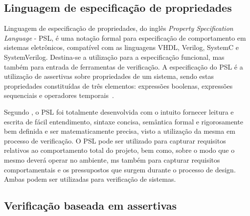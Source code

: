 \subsection{Linguagem de especificação de propriedades}
Linguagem de especificação de propriedades, do inglês \textit{Property Specification Language} - PSL, é uma notação formal para especificação de comportamento em sistemas eletrônicos, compatível com as linguagens VHDL, Verilog, SystemC e SystemVerilog. Destina-se a utilização para a especificação funcional, mas também para entrada de ferramentas de verificação. A especificação do PSL é a utilização de assertivas sobre propriedades de um sistema, sendo estas propriedades constituídas de três elementos: expressões boolenas, expressões sequenciais e operadores temporais~\cite{IEEEPSL}.


\par
Segundo \cite{IEEEPSL}, o PSL foi totalmente desenvolvida com o intuito fornecer leitura e escrita de fácil entendimento, sintaxe concisa, semântica formal e rigorosamente bem definida e ser matematicamente precisa, visto a utilização da mesma em processo de verificação. 
% 
O PSL pode ser utilizado para capturar requisitos relativos ao comportamento total do projeto, bem como, sobre o modo que o mesmo deverá operar no ambiente, ms também para capturar requisitos comportamentais e os pressupostos que surgem durante o processo de design. Ambas podem ser utilizadas para verificação de sistemas. 





\subsection{Verificação baseada em assertivas}

